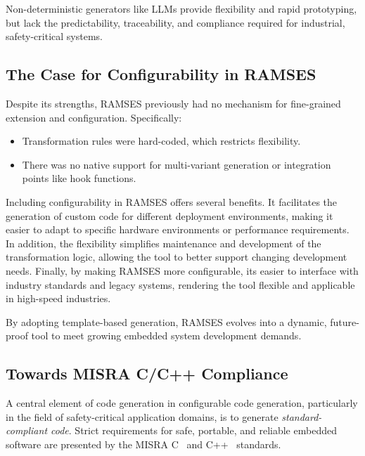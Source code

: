 \begin{tcolorbox}[colback=green!5, colframe=green!40!black]
	Non-deterministic generators like \gls{LLMs} provide flexibility and rapid prototyping, but lack the predictability, traceability, and compliance required for industrial, safety-critical systems.
\end{tcolorbox}


\subsection{The Case for Configurability in RAMSES}
\label{sec:config}

Despite its strengths, \gls{RAMSES} previously had no mechanism for fine-grained extension and configuration.
Specifically:

\begin{itemize} 
	\item Transformation rules were hard-coded, which restricts flexibility.
	\item There was no native support for multi-variant generation or integration points like hook functions. 
\end{itemize}

Including configurability in \gls{RAMSES} offers several benefits. It facilitates the generation of custom code for different deployment environments, making it easier to adapt to specific hardware environments or performance requirements. In addition, the flexibility simplifies maintenance and development of the transformation logic, allowing the tool to better support changing development needs. Finally, by making \gls{RAMSES} more configurable, its easier to interface with industry standards and legacy systems, rendering the tool flexible and applicable in high-speed industries.

\begin{tcolorbox}[colback=green!5, colframe=green!40!black] 
	By adopting template-based generation, \gls{RAMSES} evolves into a dynamic, future-proof tool to meet growing embedded system development demands. 
\end{tcolorbox}




\subsection{Towards MISRA C/C++ Compliance}
\label{sec:misra_compliance}

A central element of code generation in configurable code generation, particularly in the field of safety-critical application domains, is to generate \textit{standard-compliant code}. Strict requirements for safe, portable, and reliable embedded software are presented by the \gls{MISRA} C~\cite{Misra_C_2025} and C++~\cite{Misra_Cpp_2023} standards.

